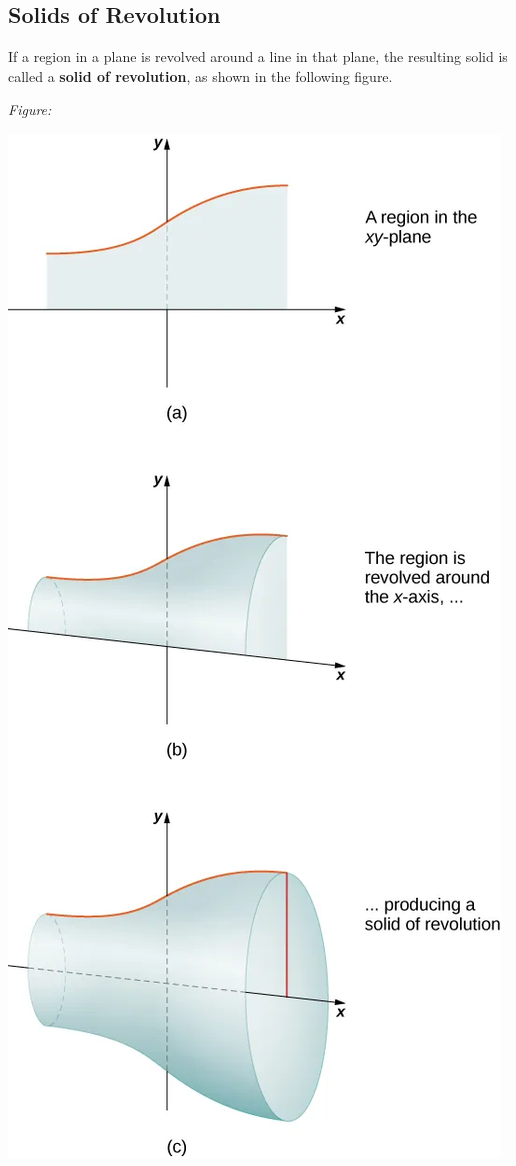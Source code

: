 \documentclass{report}
\begin{document}
    \pagebreak 
    \subsection*{Solids of Revolution}
    \bigbreak \noindent 
    \smallbreak \noindent
    \begin{definition}
        If a region in a plane is revolved around a line in that plane, the resulting solid is called a \textbf{solid of revolution}, as shown in the following figure.
    \end{definition}
    \bigbreak \noindent 
    \begin{minipage}[]{0.47\textwidth}
        \textit{Figure:}
        \bigbreak \noindent 
        \begin{center}
            \includegraphics[scale=.4]{./figures/graph20.png}

\end{center}
\end{minipage}
\end{document}
